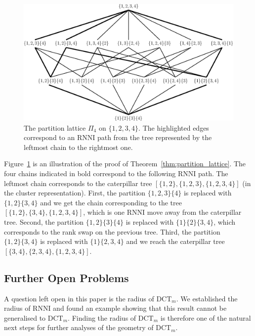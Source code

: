 \documentclass[11pt]{amsart}
\newcommand{\rnni}{\mathrm{RNNI}}
\newcommand{\dtt}{\mathrm{DCT}}
\newcommand{\summary}[1]{} %
\begin{document}
\begin{figure}[H]
\centering
\includegraphics[width=\textwidth]{partition_lattice4}
\vspace{12pt}
\caption{The partition lattice $\Pi_4$ on $\{1,2,3,4\}$.
The highlighted edges correspond to an $\rnni$ path from the tree represented by the leftmost chain to the rightmost one.}
\label{fig:partition_lattice4}
\end{figure}

Figure~\ref{fig:partition_lattice4} is an illustration of the proof of Theorem~\ref{thm:partition_lattice}.
The four chains indicated in bold correspond to the following $\rnni$ path.
The leftmost chain corresponds to the caterpillar tree $[\{1, 2\}, \{1, 2, 3\}, \{1, 2, 3, 4\}]$ (in the cluster representation).
First, the partition $\{1, 2, 3\} \{4\}$ is replaced with $\{1, 2\} \{3, 4\}$ and we get the chain corresponding to the tree $[\{1, 2\}, \{3, 4\}, \{1, 2, 3, 4\}]$, which is one $\rnni$ move away from the caterpillar tree.
Second, the partition $\{1, 2\} \{3\} \{4\}$ is replaced with $\{1\} \{2\} \{3, 4\}$, which corresponds to the rank swap on the previous tree.
Third, the partition $\{1, 2\} \{3, 4\}$ is replaced with $\{1\} \{2, 3, 4\}$ and we reach the caterpillar tree $[\{3,4\}, \{2, 3, 4\}, \{1, 2, 3, 4\}]$.

\subsection{Further Open Problems}

\summary{Radius $\dtt_m$}
A question left open in this paper is the radius of $\dtt_m$.
We established the radius of $\rnni$ and found an example showing that this result cannot be generalised to $\dtt_m$.
Finding the radius of $\dtt_m$ is therefore one of the natural next steps for further analyses of the geometry of $\dtt_m$.
\end{document}
